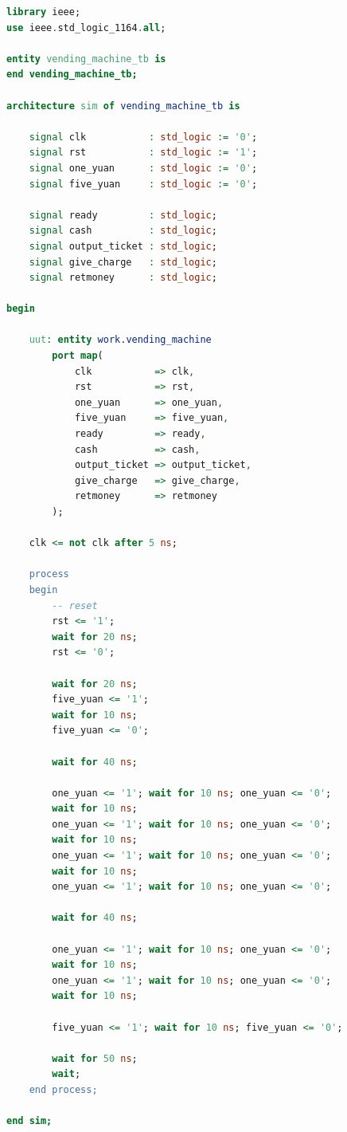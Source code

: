 \documentclass[]{article}
\begin{document}
\begin{lstlisting}[language = VHDL]
library ieee;
use ieee.std_logic_1164.all;

entity vending_machine_tb is
end vending_machine_tb;

architecture sim of vending_machine_tb is

    signal clk           : std_logic := '0';
    signal rst           : std_logic := '1';
    signal one_yuan      : std_logic := '0';
    signal five_yuan     : std_logic := '0';

    signal ready         : std_logic;
    signal cash          : std_logic;
    signal output_ticket : std_logic;
    signal give_charge   : std_logic;
    signal retmoney      : std_logic;

begin

    uut: entity work.vending_machine
        port map(
            clk           => clk,
            rst           => rst,
            one_yuan      => one_yuan,
            five_yuan     => five_yuan,
            ready         => ready,
            cash          => cash,
            output_ticket => output_ticket,
            give_charge   => give_charge,
            retmoney      => retmoney
        );

    clk <= not clk after 5 ns;

    process
    begin
        -- reset
        rst <= '1';
        wait for 20 ns;
        rst <= '0';

        wait for 20 ns;
        five_yuan <= '1';
        wait for 10 ns;
        five_yuan <= '0';

        wait for 40 ns;

        one_yuan <= '1'; wait for 10 ns; one_yuan <= '0';
        wait for 10 ns;
        one_yuan <= '1'; wait for 10 ns; one_yuan <= '0';
        wait for 10 ns;
        one_yuan <= '1'; wait for 10 ns; one_yuan <= '0';
        wait for 10 ns;
        one_yuan <= '1'; wait for 10 ns; one_yuan <= '0';

        wait for 40 ns;

        one_yuan <= '1'; wait for 10 ns; one_yuan <= '0';
        wait for 10 ns;
        one_yuan <= '1'; wait for 10 ns; one_yuan <= '0';
        wait for 10 ns;

        five_yuan <= '1'; wait for 10 ns; five_yuan <= '0';

        wait for 50 ns;
        wait;
    end process;

end sim;


\end{lstlisting}
\end{document}
